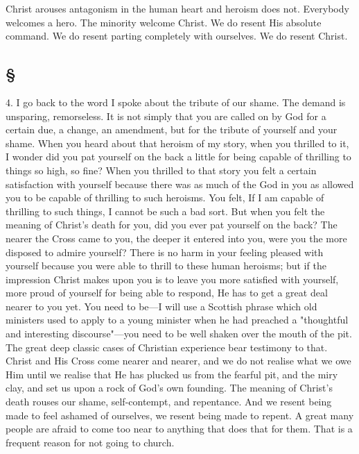 \documentclass[draft]{ptfdoc}
\begin{document}
Christ arouses antagonism in the human heart 
and heroism does not. Everybody welcomes a 
hero. The minority welcome Christ. We do 
resent His absolute command. We do resent 
parting completely with ourselves. We do 
resent Christ. 

\subsection*{ \S } 

4. I go back to the word I spoke about the 
tribute of our shame. The demand is unsparing, 
remorseless. It is not simply that you 
are called on by God for a certain due, a 
change, an amendment, but for the tribute of 
yourself and your shame. When you heard 
about that heroism of my story, when you 
thrilled to it, I wonder did you pat yourself on 
the back a little for being capable of thrilling 
to things so high, so fine? When you thrilled 
to that story you felt a certain satisfaction with 
yourself because there was as much of the God 
in you as allowed you to be capable of thrilling 
to such heroisms. You felt, If I am capable of 
thrilling to such things, I cannot be such a bad 
sort. But when you felt the meaning of 
Christ's death for you, did you ever pat yourself 
on the back? The nearer the Cross came to 
you, the deeper it entered into you, were you 
the more disposed to admire yourself? There is 
no harm in your feeling pleased with yourself 
because you were able to thrill to these human 
heroisms; but if the impression Christ makes 
upon you is to leave you more satisfied with 
yourself, more proud of yourself for being able
to respond, He has to get a great deal nearer to 
you yet. You need to be---I will use a Scottish 
phrase which old ministers used to apply to 
a young minister when he had preached a 
"thoughtful and interesting discourse"---you 
need to be well shaken over the mouth of the 
pit. The great deep classic cases of Christian 
experience bear testimony to that. Christ and 
His Cross come nearer and nearer, and we do 
not realise what we owe Him until we realise 
that He has plucked us from the fearful pit, 
and the miry clay, and set us upon a rock of 
God's own founding. The meaning of Christ's 
death rouses our shame, self-contempt, and 
repentance. And we resent being made to feel 
ashamed of ourselves, we resent being made to 
repent. A great many people are afraid to 
come too near to anything that does that for 
them. That is a frequent reason for not going 
to church. 
\end{document}
